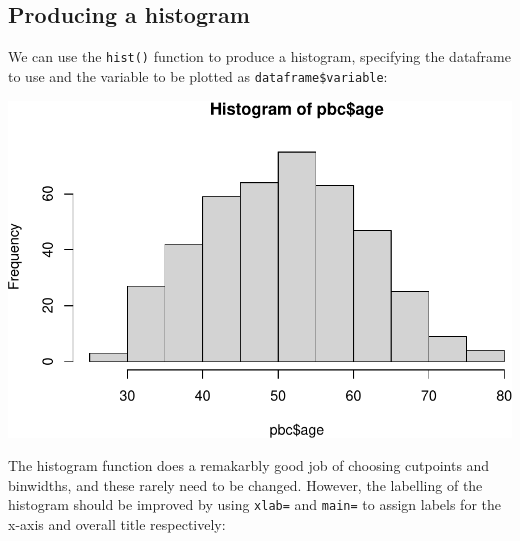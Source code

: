 \documentclass[
]{memoir}
\newenvironment{Shaded}{\begin{snugshade}}{\end{snugshade}}
\newcommand{\AttributeTok}[1]{\textcolor[rgb]{0.77,0.63,0.00}{#1}}
\newcommand{\FunctionTok}[1]{\textcolor[rgb]{0.00,0.00,0.00}{#1}}
\newcommand{\NormalTok}[1]{#1}
\newcommand{\SpecialCharTok}[1]{\textcolor[rgb]{0.00,0.00,0.00}{#1}}
\newcommand{\StringTok}[1]{\textcolor[rgb]{0.31,0.60,0.02}{#1}}
\begin{document}
\hypertarget{producing-a-histogram}{%
\subsection{Producing a histogram}\label{producing-a-histogram}}

We can use the \texttt{hist()} function to produce a histogram, specifying the dataframe to use and the variable to be plotted as \texttt{dataframe\$variable}:

\begin{Shaded}
\end{Shaded}

\includegraphics{phcm9795-R-notes_files/figure-latex/unnamed-chunk-28-1.pdf}

The histogram function does a remakarbly good job of choosing cutpoints and binwidths, and these rarely need to be changed. However, the labelling of the histogram should be improved by using \texttt{xlab=} and \texttt{main=} to assign labels for the x-axis and overall title respectively:

\begin{Shaded}
\end{Shaded}
\end{document}
